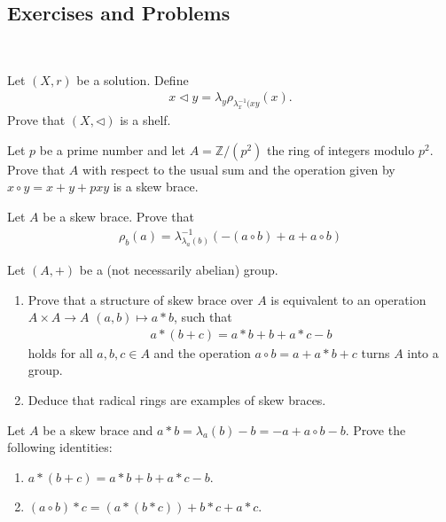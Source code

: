 \subsection{Exercises and Problems}\mbox{ }

\begin{exercise}
    Let $(X,r)$ be a solution. Define 
    \begin{align*}
        x\triangleleft y = \lambda_y\rho_{\lambda_x^{-1}(xy}(x).
    \end{align*}
    Prove that $(X,\triangleleft)$ is a shelf.
\end{exercise}

\begin{exercise}
    Let $p$ be a prime number and let  $A=\mathbb{Z}/(p^2)$ the ring of integers modulo $p^2$. Prove that $A$ with respect to the usual sum and the operation given by $x \circ y = x+y+pxy$ is a skew brace.
\end{exercise}

\begin{exercise}
    Let $A$ be a skew brace. Prove that
    \begin{align*}
        \rho_b(a) = \lambda^{-1}_{\lambda_a(b)}(-(a\circ b) +a+a\circ b)
    \end{align*}
\end{exercise}

\begin{exercise}
    Let $(A,+)$ be a (not necessarily abelian) group. 
    \begin{enumerate}
        \item Prove that a structure of skew brace over $A$ is equivalent to an operation $A\times A \to A$ $(a,b)\mapsto a\ast b$, such that
        \begin{align*}
            a \ast (b+c) = a\ast b + b + a\ast c - b
        \end{align*}
        holds for all $a,b,c \in A$ and the operation $a\circ b = a+ a\ast b + c$ turns $A$ into a group.
        \item Deduce that radical rings are examples of skew braces. 
        \end{enumerate}
\end{exercise}

\begin{exercise}
    Let $A$ be a skew brace and $a\ast b = \lambda_a(b)-b = -a+a\circ b - b$. Prove the following identities:
    \begin{enumerate}
        \item $a\ast (b+c) = a\ast b + b +a\ast c -b$.
        \item $(a\circ b)\ast c = (a\ast(b\ast c)) + b\ast c + a\ast c$.
    \end{enumerate}
\end{exercise}


